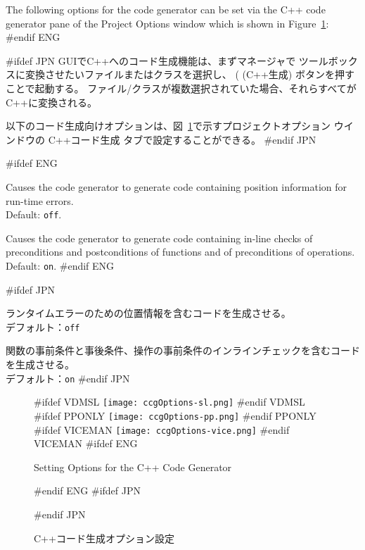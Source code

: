 \documentclass[\pformat,12pt]{article}
\newcommand{\guicmd}[1]{{\sf #1}}
\newcommand{\guicmd}[1]{{\gt #1}}
\begin{document}
The following options for the code generator can be set via the
\guicmd{C++ code generator} pane of the \guicmd{Project Options} window
which is shown in Figure~\ref{fig:optccg}:
#endif ENG

#ifdef JPN
GUIでC++へのコード生成機能は、まずマネージャで
ツールボックスに変換させたいファイルまたはクラスを選択し、 
(
(\guicmd{C++生成}) ボタンを押すことで起動する。
ファイル/クラスが複数選択されていた場合、それらすべてがC++に変換される。

以下のコード生成向けオプションは、図~\ref{fig:optccg}で示す\guicmd{プロジェクトオプション} ウインドウの
\guicmd{C++コード生成} タブで設定することができる。
#endif JPN

\begin{description}

#ifdef ENG
\item[Output position information] Causes the code
  generator to generate code containing position information for
  run-time errors. \\
  Default: \texttt{off}. 
\item[Check pre and post conditions] Causes the code
  generator to generate code containing in-line checks of
  preconditions and postconditions of functions and of preconditions
  of operations. \\
  Default: \texttt{on}. 
#endif ENG

#ifdef JPN
\item[位置情報を出力する]
  ランタイムエラーのための位置情報を含むコードを生成させる。 \\
  デフォルト：\texttt{off}
\item[事前／事後条件をチェックする]
  関数の事前条件と事後条件、操作の事前条件のインラインチェックを含むコードを生成させる。 \\
  デフォルト：\texttt{on}
#endif JPN

\end{description}

\begin{figure}[tbh]
\begin{center}
#ifdef VDMSL
\texttt{[image: ccgOptions-sl.png]}
#endif VDMSL
#ifdef PPONLY
\texttt{[image: ccgOptions-pp.png]}
#endif PPONLY
#ifdef VICEMAN
\texttt{[image: ccgOptions-vice.png]}
#endif VICEMAN
#ifdef ENG
\caption{Setting Options for the C++ Code Generator}
#endif ENG
#ifdef JPN
\caption{C++コード生成オプション設定}
#endif JPN
\label{fig:optccg}
\end{center}
\end{figure}
\end{document}
